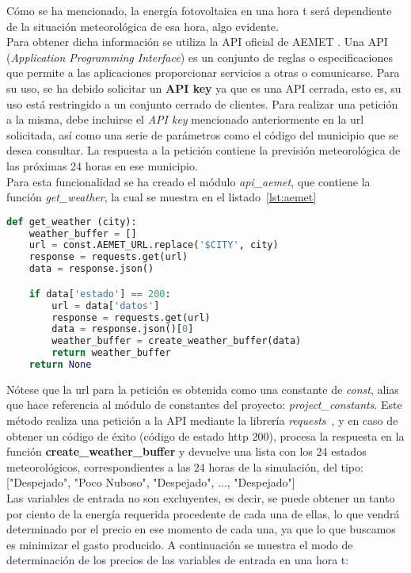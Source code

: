 Cómo se ha mencionado, la energía fotovoltaica en una hora t será dependiente de la situación meteorológica de esa hora, algo evidente.\\Para obtener dicha información se utiliza la API oficial de AEMET \cite{Aemet}. Una API (\textit{Application Programming Interface}) es un conjunto de reglas o especificaciones que permite a las aplicaciones proporcionar servicios a otras o comunicarse. Para su uso, se ha debido solicitar un \textbf{API key} ya que es una API cerrada, esto es, su uso está restringido a un conjunto cerrado de clientes. Para realizar una petición a la misma, debe incluirse el \textit{API key} mencionado anteriormente en la url solicitada, así como una serie de parámetros como el código del municipio que se desea consultar. La respuesta a la petición contiene la previsión meteorológica de las próximas 24 horas en ese municipio.\\Para esta funcionalidad se ha creado el módulo \textit{api\_aemet}, que contiene la función \textit{get\_weather}, la cual se muestra en el listado~\ref{lst:aemet}
\begin{lstlisting}[language=Python,float=ht,caption={Función para obtener los valores meteorológicos},label={lst:aemet}]
def get_weather (city):
    weather_buffer = []
    url = const.AEMET_URL.replace('$CITY', city)
    response = requests.get(url)
    data = response.json()

    if data['estado'] == 200:
        url = data['datos']
        response = requests.get(url)
        data = response.json()[0]
        weather_buffer = create_weather_buffer(data)
        return weather_buffer
    return None
\end{lstlisting}
 Nótese que la url para la petición es obtenida como una constante de \textit{const}, alias que hace referencia al módulo de constantes del proyecto: \textit{project\_constants}. Este método realiza una petición a la API mediante la librería \textit{requests}~\cite{Kenn11}, y en caso de obtener un código de éxito (código de estado http 200), procesa la respuesta en la función \textbf{create\_weather\_buffer} y devuelve una lista con los 24 estados meteorológicos, correspondientes a las 24 horas de la simulación, del tipo: ["Despejado", "Poco Nuboso", "Despejado", ..., "Despejado"]\\

Las variables de entrada no son excluyentes, es decir, se puede obtener un tanto por ciento de la energía requerida procedente de cada una de ellas, lo que vendrá determinado por el precio en ese momento de cada una, ya que lo que buscamos es minimizar el gasto producido. A continuación se muestra el modo de determinación de los precios de las variables de entrada en una hora t: \\

